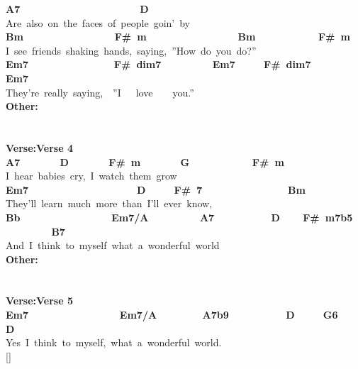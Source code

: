 \documentclass{scrartcl}
\begin{document}
{\textbf{ \hspace*{4em}A7~~~~~~~~~~~~~~~~~~~~~D} \\
Are~also~on~the~faces~of~people~goin'~by \\
\textbf{ \hspace*{6em}Bm~~~~~~~~~~~~~~~~F\#~m~~~~~~~~~~~~~~~~Bm~~~~~~~~~~~F\#~m} \\
I~see~friends~shaking~hands,~saying,~''How~do~you~do?'' \\
\textbf{ Em7~~~~~~~~~~~~~~~F\#~dim7~~~~~~~~~Em7~~~~~F\#~dim7~~~~~~~~Em7} \\
They're~really~saying,~~''I~~~love~~~~you.'' \\
\textbf{Other:} \\
\textbf{ } \\
 \\
\textbf{Verse:Verse 4} \\
\textbf{ A7~~~~~~~D~~~~~~~F\#~m~~~~~~~G~~~~~~~~~~~F\#~m} \\
I~hear~babies~cry,~I~watch~them~grow \\
\textbf{ Em7~~~~~~~~~~~~~~~~~~~D~~~~~F\#~7~~~~~~~~~~~~~~~Bm} \\
They'll~learn~much~more~than~I'll~ever~know, \\
\textbf{ \hspace*{6em}Bb~~~~~~~~~~~~~~~~Em7/A~~~~~~~~~A7~~~~~~~~~~D~~~~F\#~m7b5~~~~~~~~~B7} \\
And~I~think~to~myself~what~a~wonderful~world \\
\textbf{Other:} \\
\textbf{ } \\
 \\
\textbf{Verse:Verse 5} \\
\textbf{ \hspace*{6em}Em7~~~~~~~~~~~~~~~~Em7/A~~~~~~~~A7b9~~~~~~~~~~D~~~~~G6~~~~D} \\
Yes~I~think~to~myself,~what~a~wonderful~world. \\
{[}{]}
}
\end{document}
